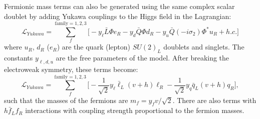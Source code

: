 Fermionic mass terms can also be generated using the same complex scalar doublet by adding Yukawa couplings to the Higgs field in the Lagrangian:
\begin{equation}
\mathcal{L}_{Yukawa} = \sum_{f}^{\text{family}=1,2,3}\Big[ -y_{\ell}\bar{L}\Phi e_{R} - y_{d}\bar{Q}\Phi d_{R} 
                       - y_{u}\bar{Q}(-i\sigma_{2})\Phi^{\ast} u_{R} + h.c. \Big]
\end{equation}
where $u_{R}$, $d_{R}$ ($e_{R}$) are the quark (lepton) $SU(2)_{L}$ doublets and singlets. The constants $y_{\ell,d,u}$ are the free parameters of the 
model. After breaking the electroweak symmetry, these terms become:
\begin{equation}
\mathcal{L}_{Yukawa} = \sum_{f}^{\text{family}=1,2,3}\Big[  -\frac{1}{\sqrt{2}}y_{\ell}\bar{\ell}_{L}(v+h)\ell_{R}    
                                                            -\frac{1}{\sqrt{2}}y_{q}\bar{q}_{L}(v+h)q_{R}  \Big],
\end{equation}
such that the masses of the fermions are $m_{f} = y_{f}v/\sqrt{2}$. There are also terms with $h\bar{f}_{L}f_{R}$ interactions with coupling
strength proportional to the fermion masses.

